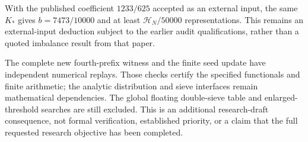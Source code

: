 \documentclass[11pt]{article}
\newcommand{\HN}{\mathcal H_N}
\begin{document}
With the published coefficient $1233/625$ accepted as an external
input, the same $K_*$ gives $b=7473/10000$ and at least
$\HN/50000$ representations. This remains an external-input
deduction subject to the earlier audit qualifications, rather than
a quoted imbalance result from that paper.

The complete new fourth-prefix witness and the finite seed update
have independent numerical replays. Those checks certify the
specified functionals and finite arithmetic; the analytic
distribution and sieve interfaces remain mathematical dependencies.
The global floating double-sieve table and enlarged-threshold
searches are still excluded. This is an additional research-draft
consequence, not formal verification, established priority, or a
claim that the full requested research objective has been completed.
\end{document}
